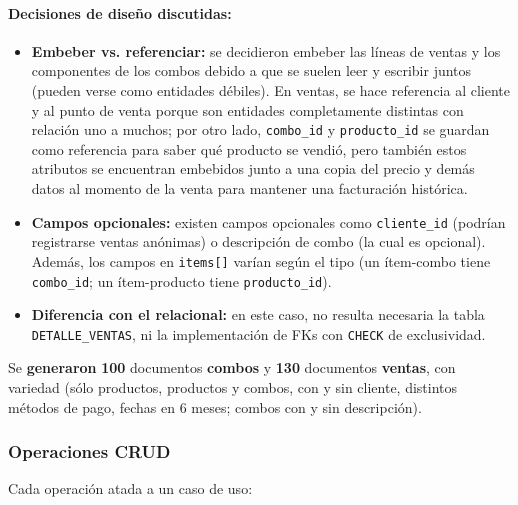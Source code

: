 \documentclass[11pt,a4paper]{article}
\begin{document}
\paragraph{Decisiones de diseño discutidas:}
\begin{itemize}[leftmargin=*]
    \item \textbf{Embeber vs. referenciar:} se decidieron embeber las líneas de ventas y
    los componentes de los combos debido a que se suelen leer y escribir juntos (pueden
    verse como entidades débiles). En ventas, se hace referencia al cliente y al punto de
    venta porque son entidades completamente distintas con relación uno a muchos; por otro
    lado, \texttt{combo\_id} y \texttt{producto\_id} se guardan como referencia para saber
    qué producto se vendió, pero también estos atributos se encuentran embebidos junto a
    una copia del precio y demás datos al momento de la venta para mantener una facturación
    histórica.
    \item \textbf{Campos opcionales:} existen campos opcionales como \texttt{cliente\_id}
    (podrían registrarse ventas anónimas) o descripción de combo (la cual es opcional).
    Además, los campos en \texttt{items[]} varían según el tipo (un ítem-combo tiene
    \texttt{combo\_id}; un ítem-producto tiene \texttt{producto\_id}).
    \item \textbf{Diferencia con el relacional:} en este caso, no resulta necesaria la
    tabla \texttt{DETALLE\_VENTAS}, ni la implementación de FKs con \texttt{CHECK} de
    exclusividad.
\end{itemize}

Se \textbf{generaron} \textbf{100} documentos \textbf{combos} y \textbf{130} documentos
\textbf{ventas}, con variedad (sólo productos, productos y combos, con y sin cliente,
distintos métodos de pago, fechas en 6 meses; combos con y sin descripción).

\subsubsection{Operaciones CRUD}

Cada operación atada a un caso de uso:
\end{document}
